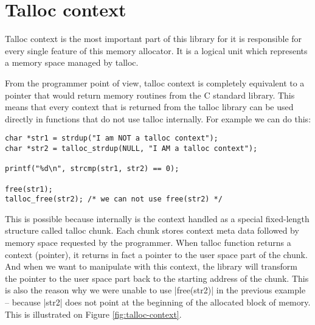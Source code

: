 \section{Talloc context}
\label{talloc:sec:context}

Talloc context is the most important part of this library for it is responsible
for every single feature of this memory allocator. It is a logical unit which
represents a memory space managed by talloc.

From the programmer point of view, talloc context is completely equivalent to a
pointer that would return memory routines from the C standard library. This
means that every context that is returned from the talloc library can be used
directly in functions that do not use talloc internally. For example we can do
this:

\begin{lstlisting}
char *str1 = strdup("I am NOT a talloc context");
char *str2 = talloc_strdup(NULL, "I AM a talloc context");

printf("%d\n", strcmp(str1, str2) == 0);

free(str1);
talloc_free(str2); /* we can not use free(str2) */
\end{lstlisting}

This is possible because internally is the context handled as a special
fixed-length structure called talloc chunk. Each chunk stores context meta data
followed by memory space requested by the programmer. When talloc function
returns a context (pointer), it returns in fact a pointer to the user space
part of the chunk. And when we want to manipulate with this context, the
library will transform the pointer to the user space part back to the starting
address of the chunk. This is also the reason why we were unable to use
|free(str2)| in the previous example -- because  |str2| does not point at the
beginning of the allocated block of memory. This is illustrated on Figure
\ref{fig:talloc-context}.

